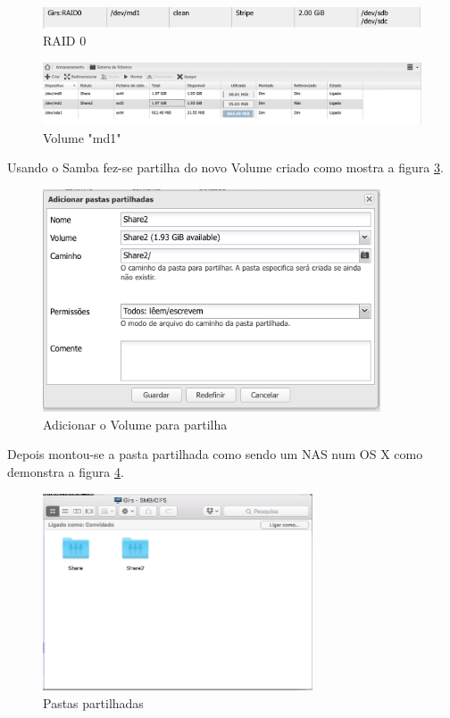 \documentclass[pdftex,12pt,a4paper]{report}
\begin{document}
\begin{figure}[!htb]
\center
 \includegraphics[width=150mm,scale=1]{imagens/RAID0.png}
 \caption{RAID 0}
 \label{fig:raid0}
\end{figure}

\begin{figure}[!htb]
\center
 \includegraphics[width=150mm,scale=1]{imagens/FileSystem.png}
 \caption{Volume "md1"}
 \label{fig:exemploraid}
\end{figure}

Usando o Samba fez-se partilha do novo Volume criado como mostra a figura \ref{fig:SharedFolders}.

\begin{figure}[!htb]
\center
 \includegraphics[width=100mm,scale=1]{imagens/AddShare2.png}
 \caption{Adicionar o Volume para partilha}
 \label{fig:SharedFolders}
\end{figure}

Depois montou-se a pasta partilhada como sendo um NAS num OS X como demonstra a figura \ref{fig:MacSharedFolders}.

\begin{figure}[!htb]
\center
 \includegraphics[width=80mm,scale=1]{imagens/MacSharedFolders.png}
 \caption{Pastas partilhadas}
 \label{fig:MacSharedFolders}
\end{figure}
\end{document}

